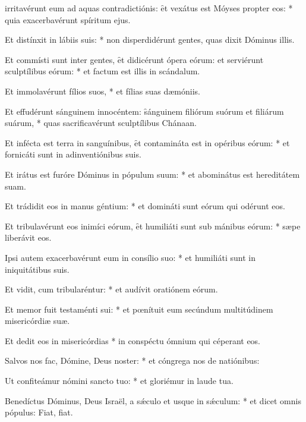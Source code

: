 \begin{psalmus}

 irritavérunt eum ad aquas contradictiónis: \f et vexátus est Móyses propter eos: * quia exacerbavérunt spíritum ejus.

Et distínxit in lábiis suis: * non disperdidérunt gentes, quas dixit Dóminus illis.

Et commísti sunt inter gentes, \f et didicérunt ópera eórum: et serviérunt sculptílibus eórum: * et factum est illis in scándalum.

Et immolavérunt fílios suos, * et fílias suas dæmóniis.

Et effudérunt sánguinem innocéntem: \f sánguinem filiórum suórum et filiárum suárum, * quas sacrificavérunt sculptílibus Chánaan.

Et infécta est terra in sanguínibus, \f et contamináta est in opéribus eórum: * et fornicáti sunt in adinventiónibus suis.

Et irátus est furóre Dóminus in pópulum suum: * et abominátus est hereditátem suam.

Et trádidit eos in manus géntium: * et domináti sunt eórum qui odérunt eos.

Et tribulavérunt eos inimíci eórum, \f et humiliáti sunt sub mánibus eórum: * sæpe liberávit eos.

Ipsi autem exacerbavérunt eum in consílio suo: * et humiliáti sunt in iniquitátibus suis.

Et vidit, cum tribularéntur: * et audívit oratiónem eórum.

Et memor fuit testaménti sui: * et pœnítuit eum secúndum multitúdinem misericórdiæ suæ.

Et dedit eos in misericórdias * in conspéctu ómnium qui céperant eos.

Salvos nos fac, Dómine, Deus noster: * et cóngrega nos de natiónibus:

Ut confiteámur nómini sancto tuo: * et gloriémur in laude tua.

Benedíctus Dóminus, Deus Israël, a sǽculo et usque in sǽculum: * et dicet omnis pópulus: Fiat, fiat.

\end{psalmus}
